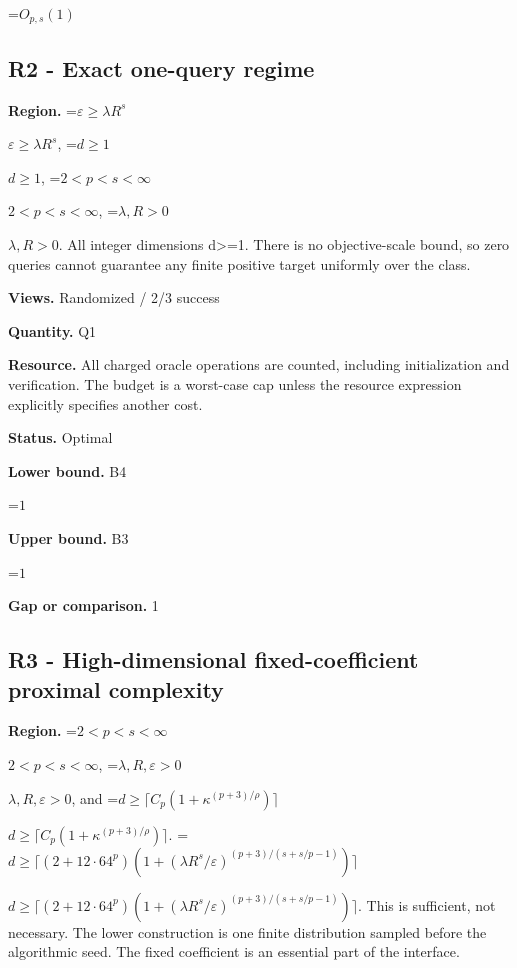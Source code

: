 \documentclass[10pt,a4paper]{article}
\newcommand{\AtlasMath}[1]{\par\begingroup\centering\setbox0=\hbox{$\displaystyle #1$}\ifdim\wd0>1.4\linewidth\typeout{ATLAS WIDE FORMULA: \the\wd0}\fi\ifdim\wd0>\linewidth\resizebox{\linewidth}{!}{\box0}\else\box0\fi\par\endgroup}
\newcommand{\AtlasInlineMath}[1]{\begingroup\setbox0=\hbox{$#1$}\ifdim\wd0>.4\linewidth\endgroup\AtlasMath{#1}\else\endgroup$#1$\fi}
\begin{document}
\AtlasMath{O_{p,s}(1)}


\subsection{R2 - Exact one-query regime}


\textbf{Region.} \AtlasInlineMath{\varepsilon\ge\lambda R^s}, \AtlasInlineMath{d\ge1}, \AtlasInlineMath{2<p<s<\infty}, \AtlasInlineMath{\lambda,R>0}. All integer dimensions d>=1. There is no objective-scale bound, so zero queries cannot guarantee any finite positive target uniformly over the class.



\textbf{Views.} Randomized / 2/3 success



\textbf{Quantity.} Q1



\textbf{Resource.} All charged oracle operations are counted, including initialization and verification. The budget is a worst-case cap unless the resource expression explicitly specifies another cost.



\textbf{Status.} Optimal



\textbf{Lower bound.} B4



\AtlasMath{1}


\textbf{Upper bound.} B3



\AtlasMath{1}


\textbf{Gap or comparison.} 1



\subsection{R3 - High-dimensional fixed-coefficient proximal complexity}


\textbf{Region.} \AtlasInlineMath{2<p<s<\infty}, \AtlasInlineMath{\lambda,R,\varepsilon>0}, and \AtlasInlineMath{d\ge\lceil C_p(1+\kappa^{(p+3)/\rho})\rceil}. \AtlasInlineMath{d\ge\lceil(2+12\cdot64^p)(1+(\lambda R^s/\varepsilon)^{(p+3)/(s+s/p-1)})\rceil}. This is sufficient, not necessary. The lower construction is one finite distribution sampled before the algorithmic seed. The fixed coefficient is an essential part of the interface.
\end{document}
